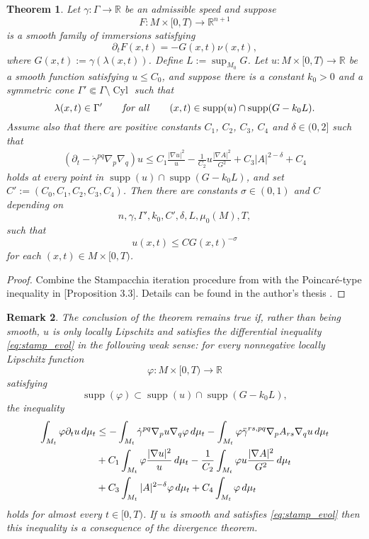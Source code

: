 \documentclass[12pt]{amsart}
\newtheorem{theorem}{Theorem}[section]
\newtheorem{remark}[theorem]{Remark}
\DeclareMathOperator{\Cyl}{Cyl}
\DeclareMathOperator{\supp}{supp}
\begin{document}
\begin{theorem}
\label{thm:Stamp}
Let $\gamma:\Gamma \to \mathbb{R}$ be an admissible speed and suppose \[F:M\times [0,T) \to \mathbb{R}^{n+1}\] is a smooth family of immersions satisfying
\[\partial_t  F(x,t) = - G(x,t) \nu(x,t),\]
where $G(x,t) := \gamma(\lambda(x,t))$. Define
$L := \sup_{M_0} G$.
Let $u : M\times[0,T) \to \mathbb{R}$ be a smooth function satisfying $u \leq C_0$, and suppose there is a constant $k_0 >0$ and a symmetric cone $\Gamma' \Subset \Gamma \setminus \Cyl$ such that 
\[\lambda(x,t) \in \Gamma' \qquad \text{\emph{for all}} \qquad  (x,t) \in \supp(u) \cap \supp(G - k_0L).\] 
Assume also that there are positive constants $C_1$, $C_2$, $C_3$, $C_4$ and $\delta \in (0,2]$ such that 
\begin{align}
\label{eq:stamp_evol}
(\partial_t - \dot \gamma^{pq} \nabla_p \nabla_q) u \leq   C_1 \frac{|\nabla u|^2}{u}- \frac{1}{C_2} u\frac{|\nabla A|^2}{G^2}  + C_3|A|^{2-\delta} +C_4
\end{align}
holds at every point in $\supp(u) \cap \supp(G - k_0 L)$, and set $C' := (C_0, C_1, C_2, C_3, C_4)$. Then there are constants $\sigma \in (0,1)$ and $C$ depending on
\[n,\gamma, \Gamma', k_0, C', \delta, L, \mu_0(M), T,\]
such that 
\[u(x,t) \leq CG(x,t)^{-\sigma}\]
for each $(x,t) \in M\times[0,T)$.
\end{theorem}
\begin{proof}
Combine the Stampacchia iteration procedure from \cite{Huisk84} with the Poincar\'{e}-type inequality in \cite{Bren-Huisk17}[Proposition 3.3]. Details can be found in the author's thesis \cite{Lynch_thesis}.
\end{proof}

\begin{remark}
\label{rem:weak_pinching}
The conclusion of the theorem remains true if, rather than being smooth, $u$ is only locally Lipschitz and satisfies the differential inequality \eqref{eq:stamp_evol} in the following weak sense: for every nonnegative locally Lipschitz function 
\[\varphi : M \times[0,T) \to \mathbb{R}\]
satisfying 
\[\supp(\varphi) \subset \supp(u) \cap \supp (G - k_0L),\]
the inequality
\begin{align}
\label{eq:weak_ineq}
 \int_{M_t}  \varphi \partial_t u\, d\mu_t &\leq   - \int_{M_t} \dot \gamma^{pq} \nabla_p u \nabla_q \varphi  \, d\mu_t  - \int_{M_t} \varphi \ddot \gamma^{rs,pq} \nabla_p A_{rs} \nabla_q u \, d\mu_t \notag\\
 & + C_1 \int_{M_t} \varphi  \frac{|\nabla u|^2}{u} \, d\mu_t- \frac{1}{C_2} \int_{M_t} \varphi u\frac{|\nabla A|^2}{G^2}   \, d\mu_t \notag \\
 &+ C_3 \int_{M_t} |A|^{2-\delta} \varphi \,d\mu_t + C_4 \int_{M_t} \varphi \,d\mu_t 
\end{align}
holds for almost every $t \in [0,T)$. If $u$ is smooth and satisfies \eqref{eq:stamp_evol} then this inequality is a consequence of the divergence theorem.
\end{remark}
\end{document}
